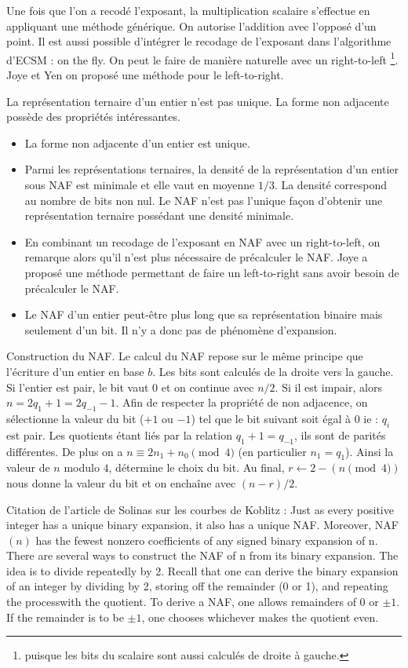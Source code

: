 Une fois que l'on a recodé l'exposant, la multiplication scalaire s'effectue en appliquant une méthode générique. On autorise l'addition avec l'opposé d'un point. Il est aussi possible d'intégrer le recodage de l'exposant dans l'algorithme d'ECSM : on the fly. On peut le faire de manière naturelle avec un right-to-left \footnote{puisque les bits du scalaire sont aussi calculés de droite à gauche.}. Joye et Yen on proposé une méthode pour le left-to-right.

La représentation ternaire d'un entier n'est pas unique. La forme non adjacente possède des propriétés intéressantes. 
\begin{itemize}[label=--]
    \item La forme non adjacente d'un entier est unique.
    \item Parmi les représentations ternaires, la densité de la représentation d'un entier sous NAF est minimale et elle vaut en moyenne $1/3$. La densité correspond au nombre de bits non nul. Le NAF n'est pas l'unique façon d'obtenir une représentation ternaire possédant une densité minimale.
    \item En combinant un recodage de l'exposant en NAF avec un right-to-left, on remarque alors qu'il n'est plus nécessaire de précalculer le NAF. Joye a proposé une méthode permettant de faire un left-to-right sans avoir besoin de précalculer le NAF.
    \item Le NAF d'un entier peut-être plus long que sa représentation binaire mais seulement d'un bit. Il n'y a donc pas de phénomène d'expansion.
\end{itemize}

Construction du NAF. Le calcul du NAF repose sur le même principe que l'écriture d'un entier en base $b$. Les bits sont calculés de la droite vers la gauche. Si l'entier est pair, le bit vaut 0 et on continue avec $n/2$. Si il est impair, alors $n = 2q_1 + 1 = 2q_{-1} - 1$. Afin de respecter la propriété de non adjacence, on sélectionne la valeur du bit ($+1$ ou $-1$) tel que le bit suivant soit égal à $0$ ie : $q_i$ est pair. Les quotients étant liés par la relation $q_1 + 1 = q_{-1}$, ils sont de parités différentes. De plus on a $n \equiv 2n_1 + n_0 \pmod 4$ (en particulier $n_1 = q_1$). Ainsi la valeur de $n$ modulo $4$, détermine le choix du bit. Au final, $r \leftarrow 2 - (n \pmod 4)$ nous donne la valeur du bit et on enchaîne avec $(n - r)/2$. 

Citation de l'article de Solinas sur les courbes de Koblitz : Just as every positive integer has a unique binary expansion, it also has a unique NAF. Moreover, NAF$(n)$ has the fewest nonzero coefficients of any signed binary expansion of n. There are several ways to construct the NAF of n from its binary expansion. The idea is to divide repeatedly by 2. Recall that one can derive the binary expansion of an integer by dividing by 2, storing off the remainder (0 or 1), and repeating the processwith the quotient. To derive a NAF, one allows remainders of 0 or $\pm 1$. If the remainder is to be $\pm 1$, one chooses whichever makes the quotient even.



